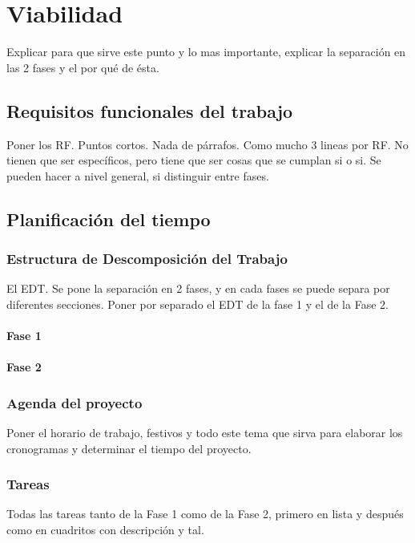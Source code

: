 \chapter{Viabilidad}
{\color{red} Explicar para que sirve este punto y lo mas importante, explicar la separación en las 2 fases y el por qué de ésta.}

\section{Requisitos funcionales del trabajo}
{\color{red} Poner los RF. Puntos cortos. Nada de párrafos. Como mucho 3 lineas por RF. No tienen que ser específicos, pero tiene que ser cosas que se cumplan si o si. Se pueden hacer a nivel general, si distinguir entre fases.}


\section{Planificación del tiempo}

\subsection[EDT]{Estructura de Descomposición del Trabajo}
{\color{red} El EDT. Se pone la separación en 2 fases, y en cada fases se puede separa por diferentes secciones. Poner por separado el EDT de la fase 1 y el de la Fase 2.}

\subsubsection{Fase 1}

\subsubsection{Fase 2}

\subsection{Agenda del proyecto}
{\color{red} Poner el horario de trabajo, festivos y todo este tema que sirva para elaborar los cronogramas y determinar el tiempo del proyecto.}

\subsection{Tareas}
{\color{red} Todas las tareas tanto de la Fase 1 como de la Fase 2, primero en lista y después como en cuadritos con descripción y tal.}

